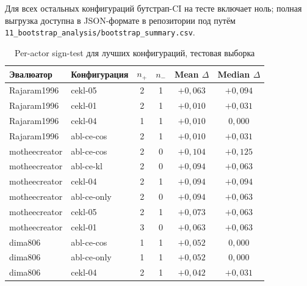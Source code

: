 \documentclass[a4paper, 12pt, oneside, openany]{article}
\begin{document}
Для всех остальных конфигураций бутстрап-CI на тесте включает ноль; полная выгрузка доступна в JSON-формате в репозитории под путём \texttt{11\_bootstrap\_analysis/bootstrap\_summary.csv}.

\begin{table}[H]
\caption{Per-actor sign-test для лучших конфигураций, тестовая выборка}
\label{tab:full_per_actor}
\centering
\small
\begin{tabular}{|p{2cm}|p{2.5cm}|c|c|c|c|}
\hline
\textbf{Эвалюатор} & \textbf{Конфигурация} & $n_+$ & $n_-$ & \textbf{Mean $\Delta$} & \textbf{Median $\Delta$} \\
\hline
Rajaram1996 & cekl-05 & 2 & 1 & $+0{,}063$ & $+0{,}094$ \\
\hline
Rajaram1996 & cekl-01 & 2 & 1 & $+0{,}010$ & $+0{,}031$ \\
\hline
Rajaram1996 & cekl-04 & 1 & 1 & $+0{,}010$ & $0{,}000$ \\
\hline
Rajaram1996 & abl-ce-cos & 2 & 1 & $+0{,}010$ & $+0{,}031$ \\
\hline
motheecreator & abl-ce-cos & 2 & 0 & $+0{,}104$ & $+0{,}125$ \\
\hline
motheecreator & abl-ce-kl & 2 & 0 & $+0{,}094$ & $+0{,}063$ \\
\hline
motheecreator & cekl-04 & 2 & 1 & $+0{,}094$ & $+0{,}094$ \\
\hline
motheecreator & abl-ce-only & 2 & 0 & $+0{,}094$ & $+0{,}063$ \\
\hline
motheecreator & cekl-05 & 2 & 1 & $+0{,}073$ & $+0{,}063$ \\
\hline
motheecreator & cekl-01 & 3 & 0 & $+0{,}063$ & $+0{,}063$ \\
\hline
dima806 & abl-ce-cos & 1 & 1 & $+0{,}052$ & $0{,}000$ \\
\hline
dima806 & abl-ce-only & 1 & 1 & $+0{,}052$ & $0{,}000$ \\
\hline
dima806 & cekl-04 & 2 & 1 & $+0{,}042$ & $+0{,}031$ \\
\hline
\end{tabular}
\end{table}

\newpage
\section{\centering}\label{PrilD}
\begin{center}
\end{center}
\setcounter{equation}{0}
\renewcommand{\theequation}{\Asbuk{section}.\arabic{equation}}
\setcounter{table}{0}
\renewcommand{\thetable}{\Asbuk{section}.\arabic{table}}
\setcounter{figure}{0}
\renewcommand{\thefigure}{\Asbuk{section}.\arabic{figure}}
\end{document}

